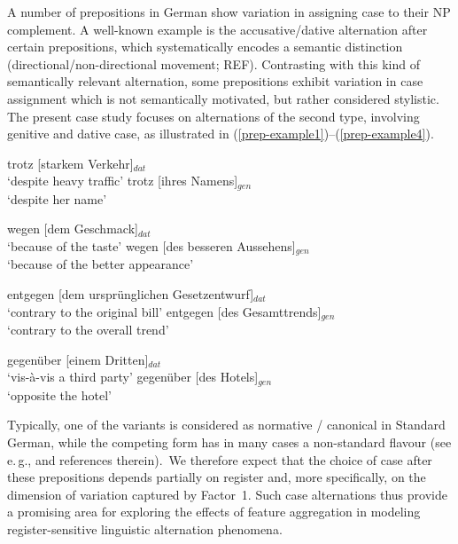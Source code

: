

A number of prepositions in German show variation in assigning  case to their NP complement.
A well-known example is the accusative/dative alternation after certain prepositions, which systematically encodes a semantic distinction (directional/non-directional movement; REF).
Contrasting with this kind of semantically relevant alternation, some prepositions exhibit variation in case assignment which is not semantically motivated, but rather considered stylistic.
The present case study focuses on alternations of the second type, involving genitive and dative case, as illustrated in (\ref{prep-example1})--(\ref{prep-example4}).

\begin{exe}
  \ex \label{prep-example1}
    \begin{xlist}
      \ex trotz [starkem Verkehr]$_{dat}$\\
          `despite heavy traffic'
      \ex trotz [ihres Namens]$_{gen}$\\ 
          `despite her name'
    \end{xlist}
  \ex
  \begin{xlist}
    \ex wegen [dem Geschmack]$_{dat}$\\
        `because of the taste'
    \ex wegen [des besseren Aussehens]$_{gen}$\\ 
        `because of the better appearance' 
  \end{xlist}
  \ex
    \begin{xlist}
      \ex entgegen [dem urspr\"unglichen Gesetzentwurf]$_{dat}$\\
          `contrary to the original bill' 
      \ex entgegen [des Gesamttrends]$_{gen}$\\ 
          `contrary to the overall trend'
  \end{xlist}
  \ex \label{prep-example4}
    \begin{xlist}
        \ex gegen\"uber [einem Dritten]$_{dat}$\\
            `vis-à-vis a third party'
        \ex gegen\"uber [des Hotels]$_{gen}$\\ 
            `opposite the hotel' 
    \end{xlist}  
\end{exe}


 Typically, one of the variants is considered as normative / canonical in Standard German, while the competing form has in many cases a non-standard flavour (see e.\,g., \citealp{Dimeola2009} and references therein).\footnotemark\ 
  We therefore expect that the choice of case after these prepositions depends partially on register and, more specifically, on the dimension of variation captured by Factor~1.
Such case alternations thus provide a promising area for exploring the effects of feature aggregation in modeling register-sensitive linguistic alternation phenomena.


